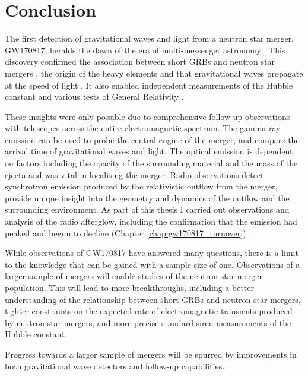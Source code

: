 \chapter{Conclusion}
\label{chap:conclusion}
\vspace{20pt}
\begingroup

The first detection of gravitational waves and light from a neutron star merger, GW170817, heralds the dawn of the era of multi-messenger astronomy \citep{2017ApJ...848L..12A}. This discovery confirmed the association between short GRBs and neutron star mergers \citep{2017ApJ...848L..13A}, the origin of the heavy elements \citep{2017ApJ...848L..19C,2017Sci...358.1559K,2017Natur.551...67P} and that gravitational waves propagate at the speed of light \citep{2017ApJ...848L..13A}. It also enabled independent measurements of the Hubble constant \citep{2017Natur.551...85A,2019NatAs...3..940H} and various tests of General Relativity \citep{2019PhRvL.123a1102A}.

These insights were only possible due to comprehensive follow-up observations with telescopes across the entire electromagnetic spectrum. The gamma-ray emission can be used to probe the central engine of the merger, and compare the arrival time of gravitational waves and light. The optical emission is dependent on factors including the opacity of the surrounding material and the mass of the ejecta and was vital in localising the merger. Radio observations detect synchrotron emission produced by the relativistic outflow from the merger, provide unique insight into the geometry and dynamics of the outflow and the surrounding environment. As part of this thesis I carried out observations and analysis of the radio afterglow, including the confirmation that the emission had peaked and begun to decline (Chapter \ref{chap:gw170817_turnover}).

While observations of GW170817 have answered many questions, there is a limit to the knowledge that can be gained with a sample size of one. Observations of a larger sample of mergers will enable studies of the neutron star merger population. This will lead to more breakthroughs, including a better understanding of the relationship between short GRBs and neutron star mergers, tighter constraints on the expected rate of electromagnetic transients produced by neutron star mergers, and more precise standard-siren measurements of the Hubble constant.

Progress towards a larger sample of mergers will be spurred by improvements in both gravitational wave detectors and follow-up capabilities.


